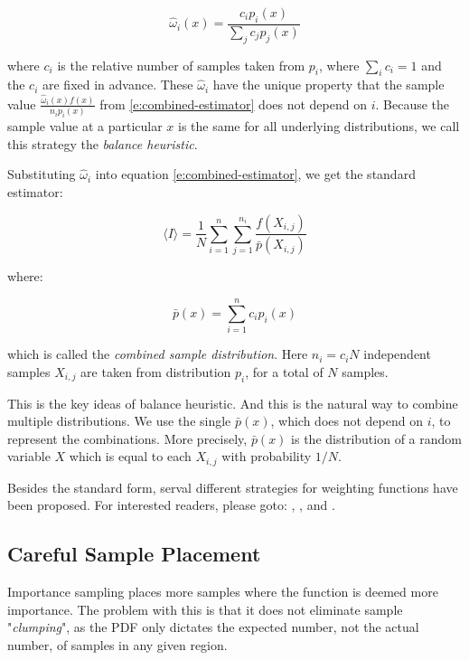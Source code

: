 \begin{equation}
	\hat{\omega}_i(x)=\frac{c_ip_i(x)}{\sum_j c_jp_j(x)}
\end{equation}

where $c_i$ is the relative number of samples taken from $p_i$, where $\sum_i c_i=1$ and the $c_i$ are fixed in advance. These $\hat{\omega}_i$ have the unique property that the sample value $\frac{\hat{\omega}_i(x)f(x)}{n_ip_i(x)}$ from \ref{e:combined-estimator} does not depend on $i$. Because the sample value at a particular $x$ is the same for all underlying distributions, we call this strategy the \textit{balance heuristic}.

Substituting $\hat{\omega}_i$ into equation \ref{e:combined-estimator}, we get the standard estimator:

\begin{equation}
	\langle I\rangle=\frac{1}{N}\sum_{i=1}^{n}\sum_{j=1}^{n_i}\frac{f(X_{i,j})}{\bar{p}(X_{i,j})}
\end{equation} 

where:

\begin{equation}
	\bar{p}(x)=\sum_{i=1}^{n}c_ip_i(x)
\end{equation}

which is called the \textit{combined sample distribution}. Here $n_i=c_i N$ independent samples $X_{i,j}$ are taken from distribution $p_i$, for a total of $N$ samples.

This is the key ideas of balance heuristic. And this is the natural way to combine multiple distributions. We use the single $\bar{p}(x)$, which does not depend on $i$, to represent the combinations. More precisely, $\bar{p}(x)$ is the distribution of a random variable $X$ which is equal to each $X_{i,j}$ with probability $1/N$.

Besides the standard form, serval different strategies for weighting functions have been proposed. For interested readers, please goto: \cite{a:Safeandeffectiveimportancesampling}, \cite[3mm]{a:AdaptiveMultipleImportanceSampling}, \cite[3mm]{a:ANADAPTIVEPOPULATIONIMPORTANCESAMPLER} and \cite[3mm]{a:EfficientMultipleImportanceSamplingEstimators}.



\subsection{Careful Sample Placement}
Importance sampling places more samples where the function is deemed more importance. The problem with this is that it does not eliminate sample "\textit{clumping}", as the PDF only dictates the expected number, not the actual number, of samples in any given region.

